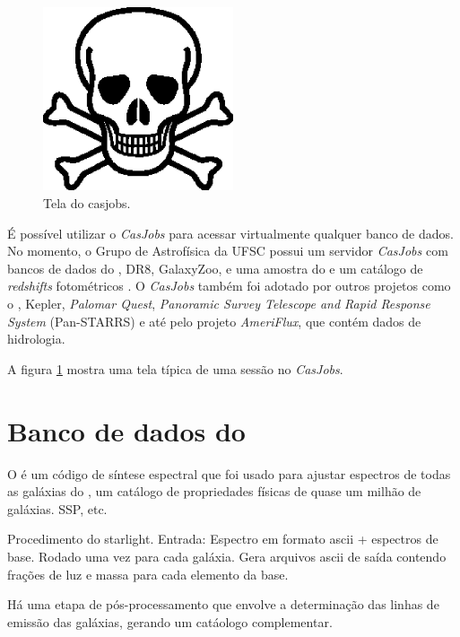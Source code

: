 \begin{figure}
	\includegraphics[width=0.5\textwidth]{figuras/test.eps}
	\caption[Tela do casjobs]
	{Tela do casjobs.}
	\label{fig:CasJobs}
\end{figure}

É possível utilizar o {\em CasJobs} para acessar virtualmente qualquer banco de
dados. No momento, o Grupo de Astrofísica da UFSC possui um servidor {\em
CasJobs} com bancos de dados do \starlight, \SDSS DR8, GalaxyZoo\citneed, e uma
amostra do \galex e um catálogo de {\em redshifts} fotométricos
\citep{OMill2011}. O {\em CasJobs} também foi adotado por outros projetos como o
\galex, Kepler\citneed, {\em Palomar Quest}\citneed, {\em Panoramic Survey
Telescope and Rapid Response System} (Pan-STARRS) e até pelo projeto {\em
AmeriFlux}, que contém dados de hidrologia\citneed.

A figura \ref{fig:CasJobs} mostra uma tela típica de uma sessão no {\em
CasJobs}.

\section{Banco de dados do \starlight}
O \starlight é um código de síntese espectral \citep{CidFernandes2005} que foi
usado para ajustar espectros de todas as galáxias do \SDSS, um catálogo de
propriedades físicas de quase um milhão de galáxias. SSP, etc.

Procedimento do starlight. Entrada: Espectro em formato ascii + espectros de
base. Rodado uma vez para cada galáxia. Gera arquivos ascii de saída contendo
frações de luz e massa para cada elemento da base.

Há uma etapa de pós-processamento que envolve a determinação das linhas de
emissão das galáxias, gerando um catáologo complementar.


